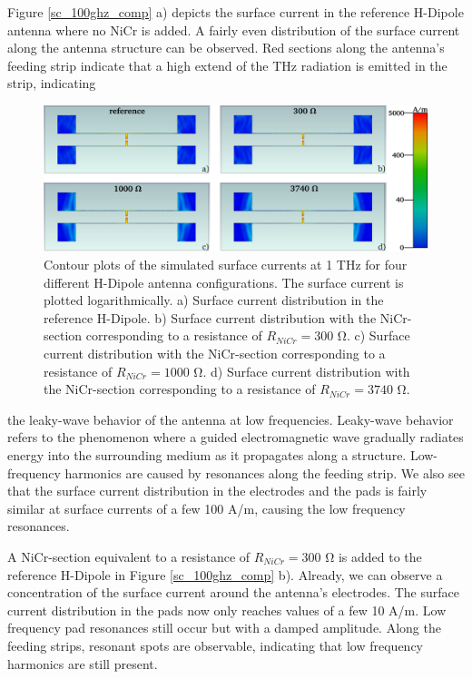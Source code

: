 Figure \ref{sc_100ghz_comp} a) depicts the surface current in the reference H-Dipole antenna where no NiCr is added. A fairly even distribution of the surface current along the antenna structure can be observed. Red sections along the antenna's feeding strip indicate that a high extend of the THz radiation is emitted in the strip, indicating
\begin{figure}[ht]
    \centering
    \includegraphics[width=\linewidth]{figures/Contour_Plots_v2/1Thz_SC_sim_plots.pdf}
    \caption{Contour plots of the simulated surface currents at \num{1} \si{\tera \hertz} for four different H-Dipole antenna configurations. The surface current is plotted logarithmically. a) Surface current distribution in the reference H-Dipole. b) Surface current distribution with the NiCr-section corresponding to a resistance of $R_{NiCr} = 300$ \si{\ohm}. c) Surface current distribution with the NiCr-section corresponding to a resistance of $R_{NiCr} = 1000$ \si{\ohm}. d) Surface current distribution with the NiCr-section corresponding to a resistance of $R_{NiCr} = 3740$ \si{\ohm}.}
    \label{sc_1thz_comp}
\end{figure}
the leaky-wave behavior of the antenna at low frequencies. Leaky-wave behavior refers to the phenomenon where a guided electromagnetic wave gradually radiates energy into the surrounding medium as it propagates along a structure. Low-frequency harmonics are caused by  resonances along the feeding strip. We also see that the surface current distribution in the electrodes and the pads is fairly similar at surface currents of a few \num{100} \si{\ampere/\meter}, causing the low frequency resonances. 

A NiCr-section equivalent to a resistance of $R_{NiCr} = 300$ \si{\ohm} is added to the reference H-Dipole in Figure \ref{sc_100ghz_comp} b). Already, we can observe a concentration of the surface current around the antenna's electrodes. The surface current distribution in the pads now only reaches values of a few \num{10} \si{\ampere/\meter}. Low frequency pad resonances still occur but with a damped amplitude. Along the feeding strips, resonant spots are observable, indicating that low frequency harmonics are still present. 


